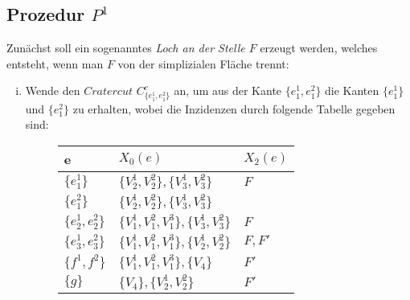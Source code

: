 \documentclass[12pt,titlepage,twoside,cleardoublepage]{article}
\theoremstyle{nummermitklammern}
\numberwithin{equation}{section}
\begin{document}
\subsection{Prozedur $P^1$}
 Zunächst soll ein sogenanntes \emph{Loch an der Stelle $F$} erzeugt werden, welches entsteht, wenn man $F$ von der simplizialen Fläche trennt:
\begin{enumerate}[(i)]
\item Wende den $Cratercut$ $C^{c}_{\{e_{1}^1,e_{1}^2\}}$ an, um aus der Kante $\{e_{1}^1,e_{1}^2\}$ die Kanten $\{e_1^1\}$ und $\{e_1^2\}$ zu erhalten, wobei
die Inzidenzen durch folgende Tabelle gegeben sind:
\begin{figure}[H]
\begin{center}
\begin{tabularx}{\textwidth}{XXX}
\hline
\textbf{e}&\textbf{$X_0(e)$}&\textbf{$X_2(e)$}\\
 \hline
 $\{e_1^1\}$ & $\{V_2^1,V_2^2\},\{V_3^1,V_3^2\}$& $F$\\
  $\{e_1^2\}$ & $\{V_2^1,V_2^2\},\{V_3^1,V_3^2\}$&\\ 
  $\{e_2^1,e_2^2\}$&$\{V_1^1,V_1^2,V_1^3\},\{V_3^1,V_3^2\}$ & $F$\\
  $\{e_3^1,e_3^2\}$&$\{V_1^1,V_1^2,V_1^3\},\{V_2^1,V_2^2\}$ & $F,F'$\\ 
   $\{f^1,f^2\}$&$\{V_1^1,V_1^2,V_1^3\},\{V_4\}$& $F'$\\
   $\{g\}$ & $\{V_4\},\{V_2^1,V_2^2\}$ & $F'$ \\


\end{tabularx}
\end{center}
\end{figure}
\end{enumerate}
\end{document}

